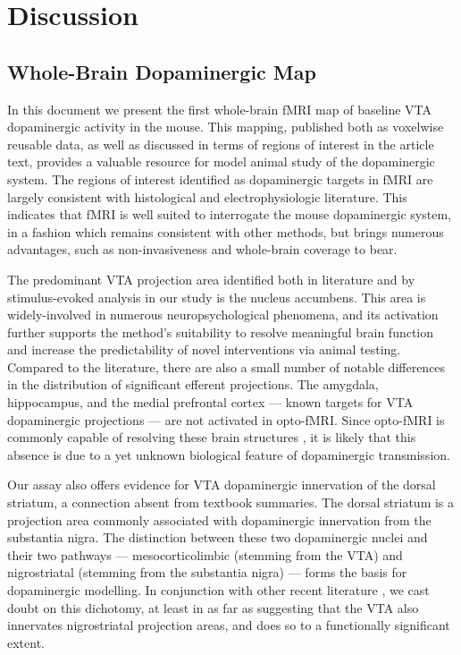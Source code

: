 \section{Discussion}

\subsection{Whole-Brain Dopaminergic Map}

In this document we present the first whole-brain fMRI map of baseline VTA dopaminergic activity in the mouse.
This mapping, published both as voxelwise reusable data, as well as discussed in terms of regions of interest in the article text, provides a valuable resource for model animal study of the dopaminergic system.
The regions of interest identified as dopaminergic targets in fMRI are largely consistent with histological and electrophysiologic literature.
This indicates that fMRI is well suited to interrogate the mouse dopaminergic system, in a fashion which remains consistent with other methods, but brings numerous advantages, such as non-invasiveness and whole-brain coverage to bear.

The predominant VTA projection area identified both in literature and by stimulus-evoked analysis in our study is the nucleus accumbens.
This area is widely-involved in numerous neuropsychological phenomena, and its activation further supports the method's suitability to resolve meaningful brain function and increase the predictability of novel interventions via animal testing.
Compared to the literature, there are also a small number of notable differences in the distribution of significant efferent projections.
The amygdala, hippocampus, and the medial prefrontal cortex --- known targets for VTA dopaminergic projections --- are not activated in opto-fMRI.
Since opto-fMRI is commonly capable of resolving these brain structures \cite{Lebhardt2015,Grandjean2019}, it is likely that this absence is due to a yet unknown biological feature of dopaminergic transmission.

Our assay also offers evidence for VTA dopaminergic innervation of the dorsal striatum, a connection absent from textbook summaries.
The dorsal striatum is a projection area commonly associated with dopaminergic innervation from the substantia nigra.
The distinction between these two dopaminergic nuclei and their two pathways --- mesocorticolimbic (stemming from the VTA) and nigrostriatal (stemming from the substantia nigra) --- forms the basis for dopaminergic modelling.
In conjunction with other recent literature \cite{Lohani2016,Pan2010}, we cast doubt on this dichotomy, at least in as far as suggesting that the VTA also innervates nigrostriatal projection areas, and does so to a functionally significant extent.

